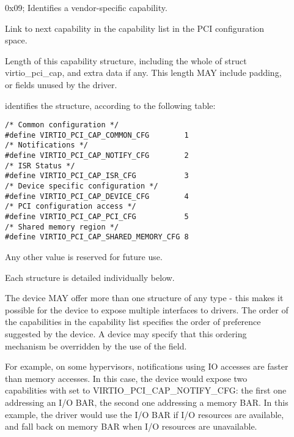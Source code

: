 \begin{description}
\item[]
        0x09; Identifies a vendor-specific capability.

\item[]
        Link to next capability in the capability list in the PCI configuration space.

\item[]
        Length of this capability structure, including the whole of
        struct virtio_pci_cap, and extra data if any.
        This length MAY include padding, or fields unused by the driver.

\item[]
        identifies the structure, according to the following table:

\begin{lstlisting}
/* Common configuration */
#define VIRTIO_PCI_CAP_COMMON_CFG        1
/* Notifications */
#define VIRTIO_PCI_CAP_NOTIFY_CFG        2
/* ISR Status */
#define VIRTIO_PCI_CAP_ISR_CFG           3
/* Device specific configuration */
#define VIRTIO_PCI_CAP_DEVICE_CFG        4
/* PCI configuration access */
#define VIRTIO_PCI_CAP_PCI_CFG           5
/* Shared memory region */
#define VIRTIO_PCI_CAP_SHARED_MEMORY_CFG 8
\end{lstlisting}

        Any other value is reserved for future use.

        Each structure is detailed individually below.

        The device MAY offer more than one structure of any type - this makes it
        possible for the device to expose multiple interfaces to drivers.  The order of
        the capabilities in the capability list specifies the order of preference
        suggested by the device.  A device may specify that this ordering mechanism be
        overridden by the use of the  field.
        \begin{note}
          For example, on some hypervisors, notifications using IO accesses are
        faster than memory accesses. In this case, the device would expose two
        capabilities with  set to VIRTIO_PCI_CAP_NOTIFY_CFG:
        the first one addressing an I/O BAR, the second one addressing a memory BAR.
        In this example, the driver would use the I/O BAR if I/O resources are available, and fall back on
        memory BAR when I/O resources are unavailable.
        \end{note}


\end{description}
